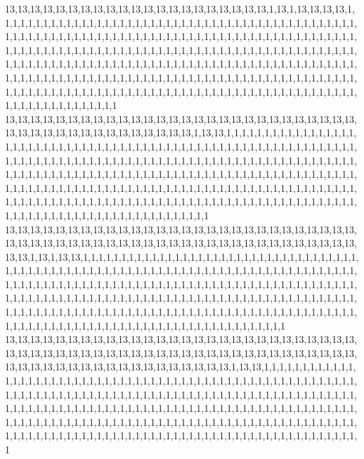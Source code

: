 13,13,13,13,13,13,13,13,13,13,13,13,13,13,13,13,13,13,13,13,13,1,13,1,13,13,13,13,1,1,1,1,1,1,1,1,1,1,1,1,1,1,1,1,1,1,1,1,1,1,1,1,1,1,1,1,1,1,1,1,1,1,1,1,1,1,1,1,1,1,1,1,1,1,1,1,1,1,1,1,1,1,1,1,1,1,1,1,1,1,1,1,1,1,1,1,1,1,1,1,1,1,1,1,1,1,1,1,1,1,1,1,1,1,1,1,1,1,1,1,1,1,1,1,1,1,1,1,1,1,1,1,1,1,1,1,1,1,1,1,1,1,1,1,1,1,1,1,1,1,1,1,1,1,1,1,1,1,1,1,1,1,1,1,1,1,1,1,1,1,1,1,1,1,1,1,1,1,1,1,1,1,1,1,1,1,1,1,1,1,1,1,1,1,1,1,1,1,1,1,1,1,1,1,1,1,1,1,1,1,1,1,1,1,1,1,1,1,1,1,1,1,1,1,1,1,1,1,1,1,1,1,1,1,1,1,1,1,1,1,1,1,1,1,1,1,1,1,1,1,1,1,1,1,1,1,1,1,1,1,1,1,1,1,1,1,1,1,1,1,1,1,1,1,1,1,1,1,1,1,1,1,1,1,1,1,1,1,1,1,1,1,1,1,1,1,1,1,1,1,1,1,1,1,1,1,1,1,1,1,1,1,1,1,1,1,1,1,1,1
13,13,13,13,13,13,13,13,13,13,13,13,13,13,13,13,13,13,13,13,13,13,13,13,13,13,13,13,13,13,13,13,13,13,13,13,13,13,13,13,13,13,13,1,13,13,1,1,1,1,1,1,1,1,1,1,1,1,1,1,1,1,1,1,1,1,1,1,1,1,1,1,1,1,1,1,1,1,1,1,1,1,1,1,1,1,1,1,1,1,1,1,1,1,1,1,1,1,1,1,1,1,1,1,1,1,1,1,1,1,1,1,1,1,1,1,1,1,1,1,1,1,1,1,1,1,1,1,1,1,1,1,1,1,1,1,1,1,1,1,1,1,1,1,1,1,1,1,1,1,1,1,1,1,1,1,1,1,1,1,1,1,1,1,1,1,1,1,1,1,1,1,1,1,1,1,1,1,1,1,1,1,1,1,1,1,1,1,1,1,1,1,1,1,1,1,1,1,1,1,1,1,1,1,1,1,1,1,1,1,1,1,1,1,1,1,1,1,1,1,1,1,1,1,1,1,1,1,1,1,1,1,1,1,1,1,1,1,1,1,1,1,1,1,1,1,1,1,1,1,1,1,1,1,1,1,1,1,1,1,1,1,1,1,1,1,1,1,1,1,1,1,1,1,1,1,1,1,1,1,1,1,1,1,1,1,1,1,1,1,1,1,1,1,1,1,1,1,1,1,1,1,1,1,1,1,1,1,1,1,1,1,1,1,1,1,1,1,1,1
13,13,13,13,13,13,13,13,13,13,13,13,13,13,13,13,13,13,13,13,13,13,13,13,13,13,13,13,13,13,13,13,13,13,13,13,13,13,13,13,13,13,13,13,13,13,13,13,13,13,13,13,13,13,13,13,13,13,1,13,1,13,13,1,1,1,1,1,1,1,1,1,1,1,1,1,1,1,1,1,1,1,1,1,1,1,1,1,1,1,1,1,1,1,1,1,1,1,1,1,1,1,1,1,1,1,1,1,1,1,1,1,1,1,1,1,1,1,1,1,1,1,1,1,1,1,1,1,1,1,1,1,1,1,1,1,1,1,1,1,1,1,1,1,1,1,1,1,1,1,1,1,1,1,1,1,1,1,1,1,1,1,1,1,1,1,1,1,1,1,1,1,1,1,1,1,1,1,1,1,1,1,1,1,1,1,1,1,1,1,1,1,1,1,1,1,1,1,1,1,1,1,1,1,1,1,1,1,1,1,1,1,1,1,1,1,1,1,1,1,1,1,1,1,1,1,1,1,1,1,1,1,1,1,1,1,1,1,1,1,1,1,1,1,1,1,1,1,1,1,1,1,1,1,1,1,1,1,1,1,1,1,1,1,1,1,1,1,1,1,1,1,1,1,1,1,1,1,1,1,1,1,1,1,1,1,1,1,1,1,1,1,1,1,1,1,1,1,1,1,1,1,1,1,1,1,1,1,1,1,1,1,1,1,1,1,1,1,1,1
13,13,13,13,13,13,13,13,13,13,13,13,13,13,13,13,13,13,13,13,13,13,13,13,13,13,13,13,13,13,13,13,13,13,13,13,13,13,13,13,13,13,13,13,13,13,13,13,13,13,13,13,13,13,13,13,13,13,13,13,13,13,13,13,13,13,13,13,13,13,13,13,13,13,1,13,13,1,1,1,1,1,1,1,1,1,1,1,1,1,1,1,1,1,1,1,1,1,1,1,1,1,1,1,1,1,1,1,1,1,1,1,1,1,1,1,1,1,1,1,1,1,1,1,1,1,1,1,1,1,1,1,1,1,1,1,1,1,1,1,1,1,1,1,1,1,1,1,1,1,1,1,1,1,1,1,1,1,1,1,1,1,1,1,1,1,1,1,1,1,1,1,1,1,1,1,1,1,1,1,1,1,1,1,1,1,1,1,1,1,1,1,1,1,1,1,1,1,1,1,1,1,1,1,1,1,1,1,1,1,1,1,1,1,1,1,1,1,1,1,1,1,1,1,1,1,1,1,1,1,1,1,1,1,1,1,1,1,1,1,1,1,1,1,1,1,1,1,1,1,1,1,1,1,1,1,1,1,1,1,1,1,1,1,1,1,1,1,1,1,1,1,1,1,1,1,1,1,1,1,1,1,1,1,1,1,1,1,1,1,1,1,1,1,1,1,1,1,1,1,1,1,1,1,1,1,1,1,1,1,1,1,1,1,1,1,1,1,1,1

